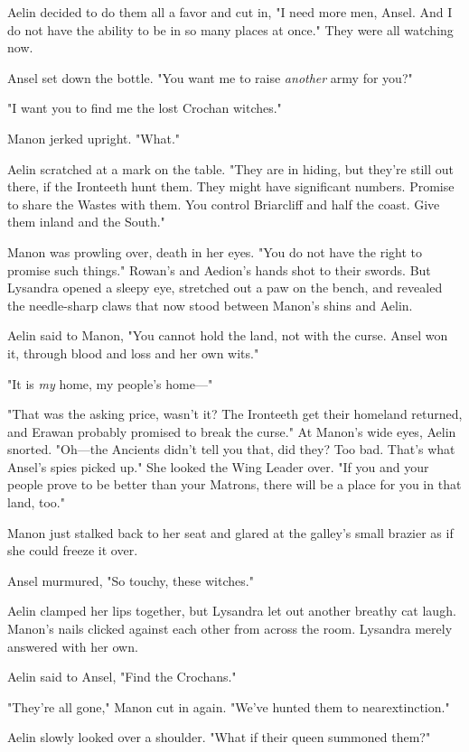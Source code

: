 Aelin decided to do them all a favor and cut in, "I need more men, Ansel.
And I do not have the ability to be in so many places at once."
They were all watching now.

Ansel set down the bottle.
"You want me to raise \emph{another} army for you?"

"I want you to find me the lost Crochan witches."

Manon jerked upright.
"What."

Aelin scratched at a mark on the table.
"They are in hiding, but they're still out there, if the Ironteeth hunt them.
They might have significant numbers.
Promise to share the Wastes with them.
You control Briarcliff and half the coast.
Give them inland and the South."

Manon was prowling over, death in her eyes.
"You do not have the right to promise such things."
Rowan's and Aedion's hands shot to their swords.
But Lysandra opened a sleepy eye, stretched out a paw on the bench, and revealed the needle-sharp claws that now stood between Manon's shins and Aelin.

Aelin said to Manon, "You cannot hold the land, not with the curse.
Ansel won it, through blood and loss and her own wits."

"It is \emph{my} home, my people's home---"

"That was the asking price, wasn't it?
The Ironteeth get their homeland returned, and Erawan probably promised to break the curse."
At Manon's wide eyes, Aelin snorted.
"Oh---the Ancients didn't tell you that, did they?
Too bad.
That's what Ansel's spies picked up."
She looked the Wing Leader over.
"If you and your people prove to be better than your Matrons, there will be a place for you in that land, too."

Manon just stalked back to her seat and glared at the galley's small brazier as if she could freeze it over.

Ansel murmured, "So touchy, these witches."

Aelin clamped her lips together, but Lysandra let out another breathy cat laugh.
Manon's nails clicked against each other from across the room.
Lysandra merely answered with her own.

Aelin said to Ansel, "Find the Crochans."

"They're all gone," Manon cut in again.
"We've hunted them to nearextinction."

Aelin slowly looked over a shoulder.
"What if their queen summoned them?"

